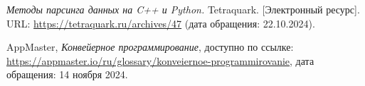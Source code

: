 
\renewcommand{\refname}{\begin{center}\MakeUppercase{Список использованных источников}\end{center}}

\begin{thebibliography}{9}

\textit{Методы парсинга данных на C++ и Python.} Tetraquark. [Электронный ресурс]. URL: \url{https://tetraquark.ru/archives/47} (дата обращения: 22.10.2024).

AppMaster, \textit{Конвейерное программирование}, доступно по ссылке: \url{https://appmaster.io/ru/glossary/konveiernoe-programmirovanie}, дата обращения: 14 ноября 2024.
  
\end{thebibliography}